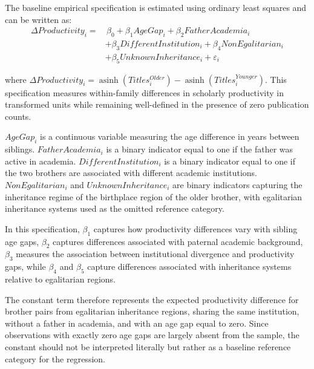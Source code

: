 The baseline empirical specification is estimated using ordinary least squares and can be written as:
\begin{align*}
\Delta Productivity_i
=
&\,
\beta_0
+
\beta_1 AgeGap_i
+
\beta_2 FatherAcademia_i
\\
&+
\beta_3 DifferentInstitution_i
+
\beta_4 NonEgalitarian_i
\\
&+
\beta_5 UnknownInheritance_i
+
\varepsilon_i
\end{align*}

where $\Delta Productivity_i = \operatorname{asinh}(Titles^{Older}_i) - \operatorname{asinh}(Titles^{Younger}_i)$. This specification measures within-family differences in scholarly productivity in transformed units while remaining well-defined in the presence of zero publication counts.

$AgeGap_i$ is a continuous variable measuring the age difference in years between siblings. $FatherAcademia_i$ is a binary indicator equal to one if the father was active in academia. $DifferentInstitution_i$ is a binary indicator equal to one if the two brothers are associated with different academic institutions. $NonEgalitarian_i$ and $UnknownInheritance_i$ are binary indicators capturing the inheritance regime of the birthplace region of the older brother, with egalitarian inheritance systems used as the omitted reference category. 

In this specification, $\beta_1$ captures how productivity differences vary with sibling age gaps, $\beta_2$ captures differences associated with paternal academic background, $\beta_3$ measures the association between institutional divergence and productivity gaps, while $\beta_4$ and $\beta_5$ capture differences associated with inheritance systems relative to egalitarian regions. 

The constant term therefore represents the expected productivity difference for brother pairs from egalitarian inheritance regions, sharing the same institution, without a father in academia, and with an age gap equal to zero. Since observations with exactly zero age gaps are largely absent from the sample, the constant should not be interpreted literally but rather as a baseline reference category for the regression.

